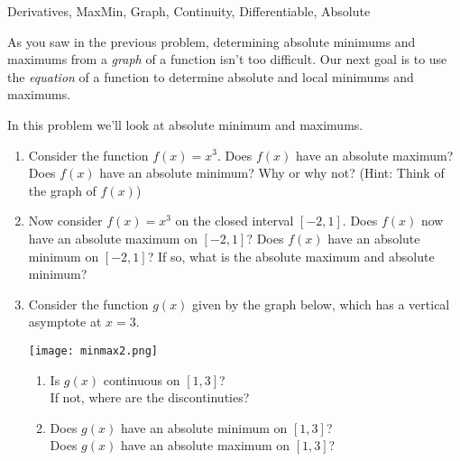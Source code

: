 

	
\begin{tagblock}{Derivatives, MaxMin, Graph, Continuity, Differentiable, Absolute}
\begin{question}
	

As you saw in the previous problem, determining absolute minimums and maximums from a \emph{graph} of a function isn't too difficult.  Our next goal is to use the \emph{equation} of a function to determine absolute and local minimums and maximums.  

\bigskip

In this problem we'll look at absolute minimum and maximums.  
\begin{enumerate}
\item Consider the function $f(x) = x^3$.  Does $f(x)$ have an absolute maximum?  Does $f(x)$ have an absolute minimum?  Why or why not?  (Hint: Think of the graph of $f(x)$)

\vspace{1.5in}
\item Now consider $f(x)=x^3$ on the closed interval $[-2,1]$.  Does $f(x)$ now have an absolute maximum on $[-2,1]$? Does $f(x)$ have an absolute minimum on $[-2,1]$?  If so, what is the absolute maximum and absolute minimum?  

\vspace{1in}
\item Consider the function $g(x)$ given by the graph below, which has a vertical asymptote at $x=3$.  

\begin{minipage}{.4\textwidth}
\texttt{[image: minmax2.png]}\end{minipage}%
\begin{minipage}{.6\textwidth}
\begin{enumerate}
\item Is $g(x)$ continuous on $[1,3]$? \\ If not, where are the discontinuties?

\vspace{.5in}

\item Does $g(x)$ have an absolute minimum on $[1,3]$?  \\
Does $g(x)$ have an absolute maximum on $[1,3]$?  


\end{enumerate}
\end{minipage}
\end{enumerate}
\end{question}
\end{tagblock}
